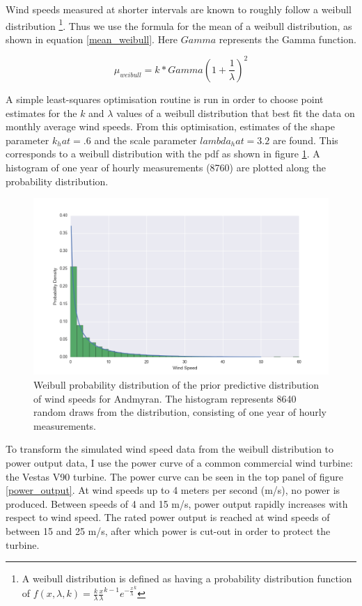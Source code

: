 \documentclass[11pt]{article}
\begin{document}
Wind speeds measured at shorter intervals are known to roughly follow a weibull distribution \footnote{A weibull distribution is defined as having a probability distribution function of $f(x, \lambda, k) = \frac{k}{\lambda} \frac{x}{\lambda}^{k-1} e^{-\frac{x}{\lambda}^k}$}. Thus we use the formula for the mean of a weibull distribution, as shown in equation \ref{mean_weibull}. Here $Gamma$ represents the Gamma function.

\begin{equation}
\mu_{weibull} = k*Gamma(1+\frac{1}{\lambda})^2
\label{mean_weibull}
\end{equation}

A simple least-squares optimisation routine is run in order to choose point estimates for the $k$ and $\lambda$ values of a weibull distribution that best fit the data on monthly average wind speeds. From this optimisation, estimates of the shape parameter $k_hat = .6$ and the scale parameter $lambda_hat = 3.2$ are found.  This corresponds to a weibull distribution with the pdf as shown in figure \ref{avg_wind_speed_data}. A histogram of one year of hourly measurements (8760) are plotted along the probability distribution. 

\begin{figure}
	\includegraphics[width=1\textwidth]{figures/prior_distribution.png}
	\caption{Weibull probability distribution of the prior predictive distribution of wind speeds for Andmyran. The histogram represents 8640 random draws from the distribution, consisting of one year of hourly measurements.}
	\label{avg_wind_speed_data}
\end{figure}

To transform the simulated wind speed data from the weibull distribution to power output data, I use the power curve of a common commercial wind turbine: the Vestas V90 turbine. The power curve can be seen in the top panel of figure \ref{power_output}. At wind speeds up to 4 meters per second (m/s), no power is produced. Between speeds of 4 and 15 m/s, power output rapidly increases with respect to wind speed. The rated power output is reached at wind speeds of between 15 and 25 m/s, after which power is cut-out in order to protect the turbine. 
\end{document}
